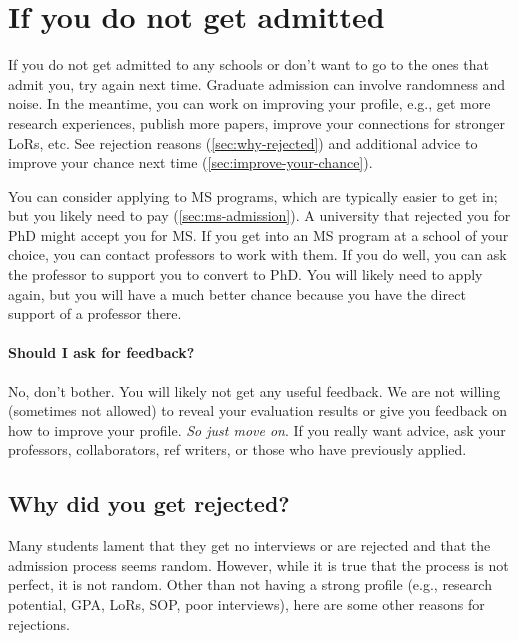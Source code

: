 \documentclass[oneside,11pt,dvipsnames]{book}
\def\subsectioninfo#1{%
    \addcontentsline{toc}{subsectioninfo}{%
    \noexpand\numberline{}\color{black}{#1}}%
}
\begin{document}
\section{If you do not get admitted}\label{sec:not-accepted} 

If you do not get admitted to any schools or don't want to go to the ones that admit you, try again next time.  Graduate admission can involve randomness and noise. In the meantime, you can work on improving your profile, e.g., get more research experiences, publish more papers, improve your connections for stronger LoRs, etc. See rejection reasons (\autoref{sec:why-rejected}) and additional advice to improve your chance next time (\autoref{sec:improve-your-chance}).

You can consider applying to MS programs, which are typically easier to get in; but you likely need to pay (\autoref{sec:ms-admission}).  A university that rejected you for PhD might accept you for MS.
If you get into an MS program at a school of your choice, you can contact professors to work with them. If you do well, you can ask the professor to support you to convert to PhD. You will likely need to apply again, but you will have a much better chance because you have the direct support of a professor there.

\paragraph{Should I ask for feedback?}
No, don't bother.  You will likely not get any useful feedback.  We are not willing (sometimes not allowed) to reveal your evaluation results or give you feedback on how to improve your profile. \emph{So just move on}.  If you really want advice, ask your professors, collaborators, ref writers, or those who have previously applied.



\subsection{Why did you get rejected?}\label{sec:why-rejected}
\subsectioninfo{You aim too high, are overqualified, or even because you applied to AI/ML, a super competitive field in recent years with many applicants.}

Many students lament that they get no interviews or are rejected and that the admission process seems random.  However, while it is true that the process is not perfect, it is not random.
Other than not having a strong profile (e.g., research potential, GPA, LoRs, SOP, poor interviews), here are some other reasons for rejections.
\end{document}
